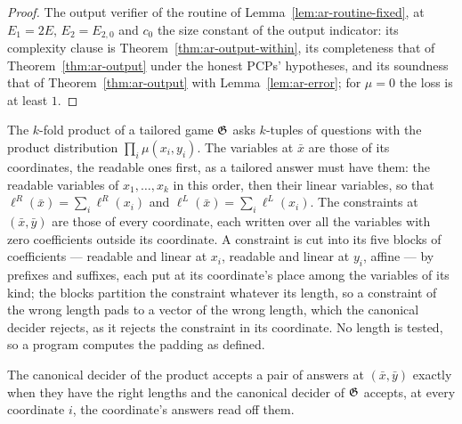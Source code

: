 \begin{proof}
\leanok
The output verifier of the routine of Lemma~\ref{lem:ar-routine-fixed}, at $E_1 = 2E$, $E_2 =
E_{2,0}$ and $c_0$ the size constant of the output indicator: its complexity clause is
Theorem~\ref{thm:ar-output-within}, its completeness that of Theorem~\ref{thm:ar-output} under the
honest PCPs' hypotheses, and its soundness that of Theorem~\ref{thm:ar-output} with
Lemma~\ref{lem:ar-error}; for $\mu = 0$ the loss is at least $1$.
\end{proof}

\begin{definition}
\label{def:tailored-product}
\leanok
The $k$-fold product of a tailored game $\mathfrak{G}$ asks $k$-tuples of questions with the product
distribution $\prod_i \mu(x_i, y_i)$. The variables at $\bar{x}$ are those of its coordinates,
the readable ones first, as a tailored answer must have them: the readable variables of $x_1,
\ldots, x_k$ in this order, then their linear variables, so that $\ell^R(\bar{x}) = \sum_i
\ell^R(x_i)$ and $\ell^L(\bar{x}) = \sum_i \ell^L(x_i)$. The constraints at $(\bar{x},
\bar{y})$ are those of every coordinate, each written over all the variables with zero
coefficients outside its coordinate. A constraint is cut into its five blocks of coefficients
--- readable and linear at $x_i$, readable and linear at $y_i$, affine --- by prefixes and
suffixes, each put at its coordinate's place among the variables of its kind; the blocks
partition the constraint whatever its length, so a constraint of the wrong length pads to a
vector of the wrong length, which the canonical decider rejects, as it rejects the constraint
in its coordinate. No length is tested, so a program computes the padding as defined.
\end{definition}

\begin{lemma}
\label{lem:tailored-product-accepts}
\leanok
The canonical decider of the product accepts a pair of answers at $(\bar{x}, \bar{y})$ exactly
when they have the right lengths and the canonical decider of $\mathfrak{G}$ accepts, at every
coordinate $i$, the coordinate's answers read off them.
\end{lemma}

